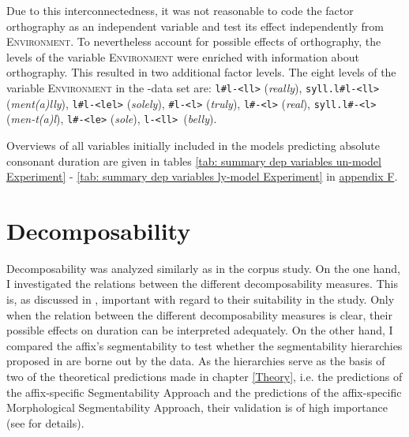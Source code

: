  Due to this interconnectedness, it was not reasonable to code the factor orthography as an independent variable and test its effect independently from \textsc{Environment}. 
 To nevertheless account for possible effects of orthography, the levels of the variable \textsc{Environment} were enriched with information about orthography. 
This resulted in two additional factor levels.
   The eight levels of the variable \textsc{Environment} in the -data set are: \texttt{l\#l-<ll>} (\textit{really}), \texttt{syll.l\#l-<ll>} (\textit{ment(a)lly}), \texttt{l\#l-<lel>} (\textit{solely}), \texttt{\#l-<l>} (\textit{truly}), \texttt{l\#-<l>} (\textit{real}), \texttt{syll.l\#-<l>} (\textit{men-t(a)l}),  \texttt{l\#-<le>} (\textit{sole}), \texttt{l-<ll> }(\textit{belly}). 		

Overviews of all variables initially included in the models predicting absolute consonant duration are given in tables \ref{tab: summary dep variables un-model Experiment} - \ref{tab: summary dep variables ly-model Experiment} in \hyperref[Appendix F Summaries of variables in initial models of experimental study]{appendix F}.



\section{Decomposability} \label{decomposability experiment}


 

Decomposability was analyzed similarly as in the corpus study. On the one hand, I investigated the relations between the different decomposability measures. This is, as discussed in , important with regard to their suitability in the study. Only when the relation between the different decomposability measures is clear, their possible effects on duration can be interpreted adequately.  
On the other hand, I compared the affix's segmentability to test whether the segmentability hierarchies proposed in  are borne out by the data.  As the hierarchies serve as the basis of two of the theoretical predictions made in chapter \ref{Theory}, i.e. the predictions of the affix-specific Segmentability Approach and the predictions of the affix-specific Morphological Segmentability Approach, their validation is of high importance (see  for details). 




